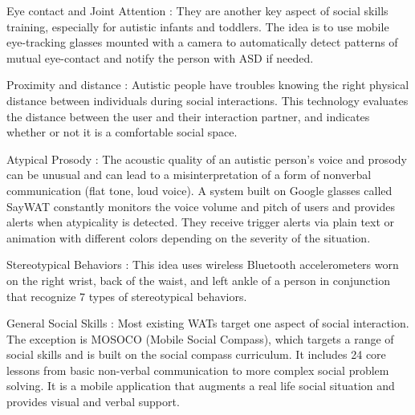 Eye contact and Joint Attention : They are another key aspect of social skills training, especially for autistic infants and toddlers. The idea is to use mobile eye-tracking glasses mounted with a camera to automatically detect patterns of mutual eye-contact and notify the person with ASD if needed.

Proximity and distance : Autistic people have troubles knowing the right physical distance between individuals during social interactions. This technology evaluates the distance between the user and their interaction partner, and indicates whether or not it is a comfortable social space. 

Atypical Prosody : The acoustic quality of an autistic person’s voice and prosody can be unusual and can lead to a misinterpretation of a form of nonverbal communication (flat tone, loud voice). A system built on Google glasses called SayWAT constantly monitors the voice volume and pitch of users and provides alerts when atypicality is detected. They receive trigger alerts via plain text or animation with different colors depending on the severity of the situation.
 
Stereotypical Behaviors : This idea uses wireless Bluetooth accelerometers worn on the right wrist, back of the waist, and left ankle of a person in conjunction that recognize 7 types of stereotypical behaviors. 

General Social Skills : Most existing WATs target one aspect of social interaction. The exception is MOSOCO (Mobile Social Compass), which targets a range of social skills and is built on the social compass curriculum. It includes 24 core lessons from basic non-verbal communication to more complex social problem solving. It is a mobile application that augments a real life social situation and provides visual and verbal support.
